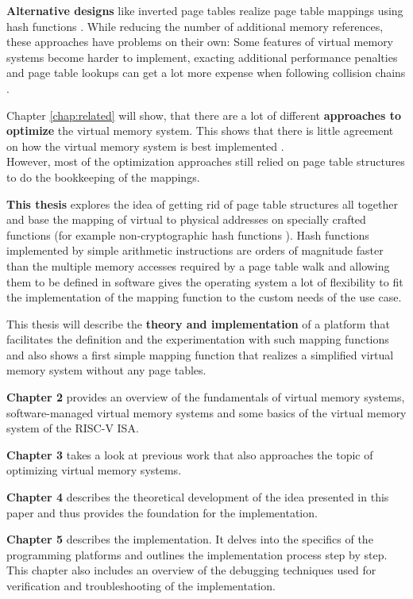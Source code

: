 \textbf{Alternative designs} like inverted page tables realize page table mappings using hash functions \cite{tanenbaumOS}. While reducing the number of additional memory references, these approaches have problems on their own: Some features of virtual memory systems become harder to implement, exacting additional performance penalties \cite{yaniv2016hash} and page table lookups can get a lot more expense when following collision chains \cite{jacob1998look}.

Chapter \ref{chap:related} will show, that there are a lot of different \textbf{approaches to optimize} the virtual memory system.
This shows that there is little agreement on how the virtual memory system is best implemented \cite{jacob1998look}.\\
However, most of the optimization approaches still relied on page table structures to do the bookkeeping of the mappings.

\textbf{This thesis} explores the idea of getting rid of page table structures all together and base the mapping of virtual to physical addresses on specially crafted functions (for example non-cryptographic hash functions \cite{mittelbach2021non}).
Hash functions implemented by simple arithmetic instructions are orders of magnitude faster than the multiple memory accesses required by a page table walk \cite{tanenbaumOS} and allowing them to be defined in software gives the operating system a lot of flexibility to fit the implementation of the mapping function to the custom needs of the use case.

This thesis will describe the \textbf{theory and implementation} of a platform that facilitates the definition and the experimentation with such mapping functions and also shows a first simple mapping function that realizes a simplified virtual memory system without any page tables.


\textbf{Chapter 2} provides an overview of the fundamentals of virtual memory systems, software-managed virtual memory systems and some basics of the virtual memory system of the RISC-V ISA.

\textbf{Chapter 3} takes a look at previous work that also approaches the topic of optimizing virtual memory systems.

\textbf{Chapter 4} describes the theoretical development of the idea presented in this paper and thus provides the foundation for the implementation.

\textbf{Chapter 5} describes the implementation. It delves into the specifics of the programming platforms and outlines the implementation process step by step. This chapter also includes an overview of the debugging techniques used for verification and troubleshooting of the implementation.

